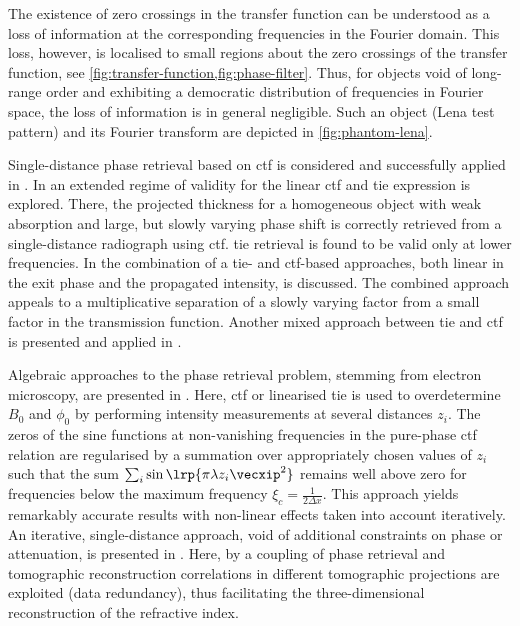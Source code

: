 \documentclass[
twoside,
openright,
titlepage,
numbers=noenddot,
headinclude,
fleqn,
a4paper,
footinclude=true,
cleardoublepage=empty,
abstractoff,
BCOR=5mm,
paper=a4,
fontsize=11pt,
british,ngerman,american,
]{scrreprt}
\begin{document}
The existence of zero crossings in the transfer function can be
understood as a loss of information at the corresponding frequencies
in the Fourier domain.  This loss, however, is localised to small
regions about the zero crossings of the transfer function, see
\cref{fig:transfer-function,fig:phase-filter}.  Thus, for objects void
of long-range order and exhibiting a democratic distribution of
frequencies in Fourier space, the loss of information is in general
negligible.  Such an object  (Lena test pattern) and its Fourier
transform are depicted in \cref{fig:phantom-lena}.

Single-distance phase retrieval based on \ac{ctf} is considered and
successfully applied in \cite{Turner2004, Gureyev2006OptCommun,
  Gureyev2006apl}.  In \cite{Turner2004} an extended regime of
validity for the linear \ac{ctf} and \ac{tie} expression is explored.
There, the projected thickness for a homogeneous object with weak
absorption and large, but slowly varying phase shift is correctly
retrieved from a single-distance radiograph using \ac{ctf}. 
\ac{tie} retrieval is found to be valid only at lower frequencies.  In
\cite{Gureyev2006OptCommun,Gureyev2006apl} the combination of a
\ac{tie}- and \ac{ctf}-based approaches, both linear in the exit phase
and the propagated intensity, is discussed.  The combined approach
appeals to a multiplicative separation of a slowly varying factor from
a small factor in the transmission function.  Another mixed approach
between \ac{tie} and \ac{ctf} is presented and applied in
\cite{WuLiu2004,Gureyev2004,Langer2008}.

Algebraic approaches to the phase retrieval problem, stemming from
electron microscopy, are presented in
\cite{Kirkland1998,Op1996,Cloetens1999diss}.  Here, \ac{ctf} or
linearised \ac{tie} is used to overdetermine $B_0$ and $\phi_0$ by
performing intensity measurements at several distances $z_i$.  The
zeros of the sine functions at non-vanishing frequencies in the
pure-phase \ac{ctf} relation are regularised by a summation over
appropriately chosen values of $z_i$ such that the sum
$\sum_i\sin\lrp{\pi\lambda z_i \vecxip^2}$ remains well above zero for
frequencies below the maximum frequency $\xi_c = \frac{1}{2\Delta x}$.
This approach yields remarkably accurate results with non-linear
effects taken into account iteratively.  An iterative, single-distance
approach, void of additional constraints on phase or attenuation, is
presented in \cite{Ruhlandt2014}.  Here, by a coupling of phase
retrieval and tomographic reconstruction correlations in different
tomographic projections are exploited (data redundancy), thus
facilitating the three-dimensional reconstruction of the refractive
index.
\end{document}
